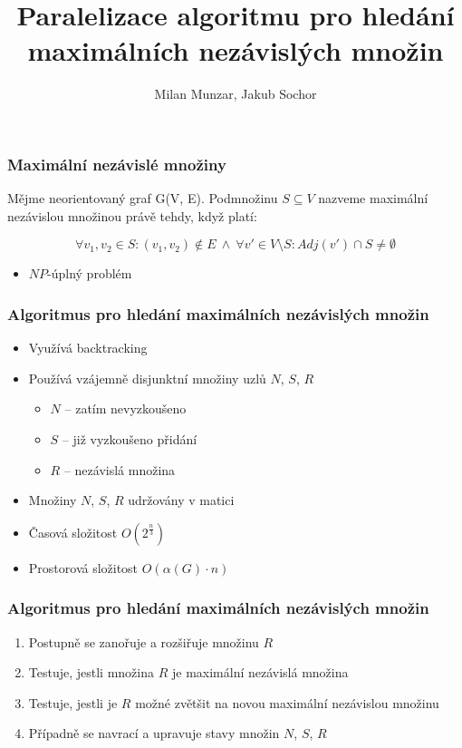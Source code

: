 \documentclass[table, czech]{beamer}
\title{Paralelizace algoritmu pro hledání\\maximálních nezávislých množin}
\author{Milan Munzar, Jakub Sochor}
\institute[FIT]{Fakulta informačních technologií VUT v Brně}
\begin{document}
\frame[plain] { \titlepage }
\frame
{
    \frametitle{Maximální nezávislé množiny}
\begin{definition} 
Mějme neorientovaný graf G(V, E). Podmnožinu $S \subseteq V$ nazveme maximální nezávislou množinou právě tehdy, když platí:

\begin{equation*}
\forall v_1, v_2 \in S: (v_1, v_2) \notin E\ \wedge\ \forall v' \in V \setminus S: Adj(v') \cap S \neq \emptyset
\end{equation*}
\end{definition}
\begin{itemize}
    \item $NP$-úplný problém
\end{itemize}

}

\frame
{
    \frametitle{Algoritmus pro hledání maximálních nezávislých množin}
    \begin{itemize}
        \item Využívá backtracking
        \item Používá vzájemně disjunktní množiny uzlů $N$, $S$, $R$
        \begin{itemize}
            \item $N$ -- zatím nevyzkoušeno
            \item $S$ -- již vyzkoušeno přidání
            \item $R$ -- nezávislá množina
        \end{itemize}
        \item Množiny $N$, $S$, $R$ udržovány v matici
        \item Časová složitost $O(2^{\frac{n}{3}})$
        \item Prostorová složitost $O(\alpha(G) \cdot n)$
    \end{itemize}
}

\frame
{
    \frametitle{Algoritmus pro hledání maximálních nezávislých množin}
    \begin{enumerate}
        \item Postupně se zanořuje a rozšiřuje množinu $R$
        \item Testuje, jestli množina $R$ je maximální nezávislá množina
        \item Testuje, jestli je $R$ možné zvětšit na novou maximální nezávislou množinu 
        \item Případně se navrací a upravuje stavy množin $N$, $S$, $R$
    \end{enumerate}  
}
\end{document}

